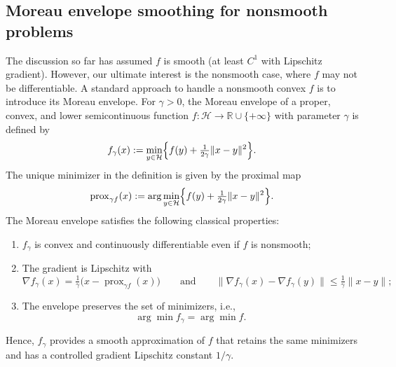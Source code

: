 \documentclass[11pt]{article}
\numberwithin{equation}{section}
\begin{document}
\subsection{Moreau envelope smoothing for nonsmooth problems}
The discussion so far has assumed $f$ is smooth (at least $C^1$ with Lipschitz gradient). However, our ultimate interest is the nonsmooth case, where $f$ may not be differentiable. A standard approach to handle a nonsmooth convex $f$ is to introduce its {Moreau envelope}. For \(\gamma>0\), the {Moreau envelope} of a proper, convex, and lower semicontinuous function 
$f:\mathcal{H}\to\mathbb{R}\cup\{+\infty\}$
 with parameter \(\gamma\) is defined by
\[
f_\gamma(x) := \min_{y \in \mathcal H} \Bigl\{ f(y) + \tfrac{1}{2\gamma}\|x - y\|^2 \Bigr\}.
\]
The unique minimizer in the definition is given by the {proximal map}
\[
\operatorname{prox}_{\gamma f}(x) := \arg\min_{y \in \mathcal H} \Bigl\{ f(y) + \tfrac{1}{2\gamma}\|x - y\|^2 \Bigr\}.
\]
The Moreau envelope satisfies the following classical properties:
\begin{enumerate}
    \item \(f_\gamma\) is convex and continuously differentiable even if \(f\) is nonsmooth;
    \item The gradient is Lipschitz with
    \[
    \nabla f_\gamma(x) = \tfrac{1}{\gamma}\bigl(x - \operatorname{prox}_{\gamma f}(x)\bigr)
    \qquad\text{and}\qquad
    \|\nabla f_\gamma(x) - \nabla f_\gamma(y)\| \le \tfrac{1}{\gamma}\|x-y\|;
    \]
    \item The envelope preserves the set of minimizers, i.e.,
    \[
    \arg\min f_\gamma = \arg\min f.
    \]
\end{enumerate}
Hence, \(f_\gamma\) provides a smooth approximation of \(f\) that retains the same minimizers and has a controlled gradient Lipschitz constant \(1/\gamma\). 
\end{document}
